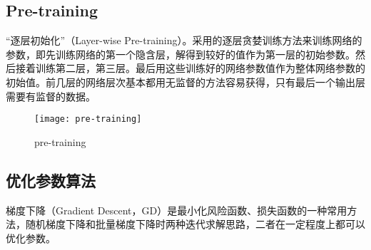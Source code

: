 \subsection{Pre-training}
``逐层初始化''（Layer-wise Pre-training）。采用的逐层贪婪训练方法来训练网络的参数，即先训练网络的第一个隐含层，解得到较好的值作为第一层的初始参数。然后接着训练第二层，第三层。最后用这些训练好的网络参数值作为整体网络参数的初始值。前几层的网络层次基本都用无监督的方法容易获得，只有最后一个输出层需要有监督的数据。
\begin{figure}[!ht]
\centering
\texttt{[image: pre-training]}
\caption{pre-training}
\end{figure}

\subsection{优化参数算法}
梯度下降（Gradient Descent，GD）是最小化风险函数、损失函数的一种常用方法，随机梯度下降和批量梯度下降时两种迭代求解思路，二者在一定程度上都可以优化参数。
